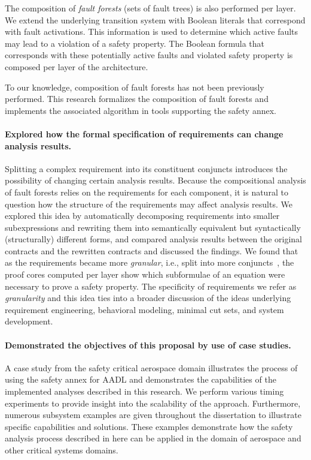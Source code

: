 The composition of {\em fault forests} (sets of fault trees) is also performed per layer. We extend the underlying transition system with Boolean literals that correspond with fault activations. This information is used to determine which active faults may lead to a violation of a safety property. The Boolean formula that corresponds with these potentially active faults and violated safety property is composed per layer of the architecture.

To our knowledge, composition of fault forests has not been previously performed. This research formalizes the composition of fault forests and implements the associated algorithm in tools supporting the safety annex.

\paragraph{Explored how the formal specification of requirements can change analysis results.}
Splitting a complex requirement into its constituent conjuncts introduces the possibility of changing certain analysis results. Because the compositional analysis of fault forests relies on the requirements for each component, it is natural to question how the structure of the requirements may affect analysis results. We explored this idea by automatically decomposing requirements into smaller subexpressions and rewriting them into semantically equivalent but syntactically (structurally) different forms, and compared analysis results between the original contracts and the rewritten contracts and discussed the findings. We found that as the requirements became more \emph{granular}, i.e., split into more conjuncts~\cite{ghassabani_2018}, the proof cores computed per layer show which subformulae of an equation were necessary to prove a safety property. The specificity of requirements we refer as \emph{granularity} and this idea ties into a broader discussion of the ideas underlying requirement engineering, behavioral modeling, minimal cut sets, and system development. 

\paragraph{Demonstrated the objectives of this proposal by use of case studies.}
A case study from the safety critical aerospace domain illustrates the process of using the safety annex for AADL and demonstrates the capabilities of the implemented analyses described in this research. We perform various timing experiments to provide insight into the scalability of the approach. Furthermore, numerous subsystem examples are given throughout the dissertation to illustrate specific capabilities and solutions. These examples demonstrate how the safety analysis process described in here can be applied in the domain of aerospace and other critical systems domains. \\

